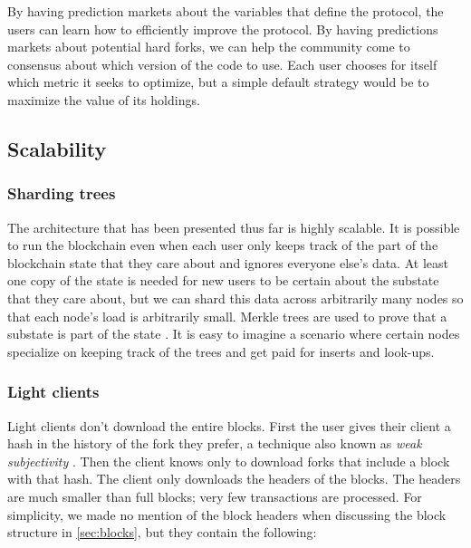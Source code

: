 \documentclass[a4paper, 10pt, conference]{ieeeconf}      %
\begin{document}
\begin{draft}
\begin{draft}
 
By having prediction markets about the variables that define the protocol, the users can learn how to efficiently improve the protocol. By having predictions markets about potential hard forks, we can help the community come to consensus about which version of the code to use. Each user chooses for itself which metric it seeks to optimize, but a simple default strategy would be to maximize the value of its holdings.
\end{draft}
      
\subsection{Scalability}
\label{sec:scalability}

\subsubsection{Sharding trees}
The architecture that has been presented thus far is highly scalable. It is possible to run the blockchain even when each user only keeps track of the part of the blockchain state that they care about and ignores everyone else's data. At least one copy of the state is needed for new users to be certain about the substate that they care about, but we can shard this data across arbitrarily many nodes so that each node's load is arbitrarily small. Merkle trees are used to prove that a substate is part of the state \cite{github-merkle}. It is easy to imagine a scenario where certain nodes specialize on keeping track of the trees and get paid for inserts and look-ups.

\subsubsection{Light clients}
Light clients don't download the entire blocks. First the user gives their client a hash in the history of the fork they prefer, a technique also known as \emph{weak subjectivity} \cite{weak-subjectivity}. Then the client knows only to download forks that include a block with that hash. The client only downloads the headers of the blocks. The headers are much smaller than full blocks; very few transactions are processed. For simplicity, we made no mention of the block headers when discussing the block structure in \cref{sec:blocks}, but they contain the following:


\end{draft}
\end{document}
